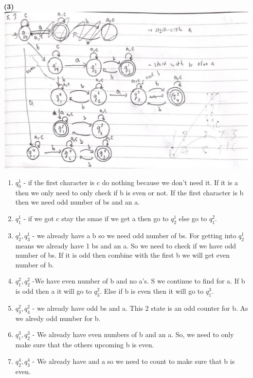 \documentclass[a4paper, 11pt]{article}
\renewcommand{\part}[1] {\vspace{.10in} {\bf (#1)}}
\begin{document}
\part{3}\\
\includegraphics[width=\textwidth]{Q5-3.png}\\
\begin{enumerate}
	\item $q_0^1$ - if the first character is c do nothing because we don't need it. If it is a then we only need to only check if b is even or not. If the first character is b then we need odd number of bs and an a.
	\item $q_1^1$ - if we got c stay the smae if we get a then go to $q_2^1$ else go to $q_1^2$.
	\item $q_2^1,q_3^1$ - we already have a b so we  need odd number of bs. For getting into $q_2^1$ means we already have 1 bs and an a. So we need to check if we have odd number of bs. If it is odd then combine with the first b we will get even number of b.
	\item $q_1^2, q_2^2$ -We have even number of b and no a's. S we continue to find for a. If b is odd then a it will go to $q_3^2$. Else if b is even then it will go to $q_1^3$.
	\item $q_3^2, q_4^2$ - we already have odd bs and a. This 2 state is an odd counter for b. As we alredy odd number for b.
	\item $q_1^3, q_2^3$ - We already have even numbers of b and an a. So, we need to only make sure that the others upcoming b is even.
	\item $q_2^4, q_3^4$ - We already have and a so we need to count to make sure that b is even. 
\end{enumerate}
 
\end{document}
